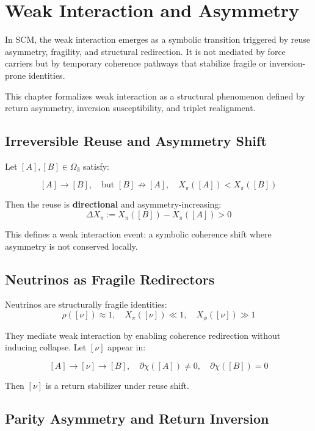 \chapter{Weak Interaction and Asymmetry} \label{chapter-weak-interaction}

In SCM, the weak interaction emerges as a symbolic transition triggered by reuse asymmetry, fragility, and structural redirection. It is not mediated by force carriers but by temporary coherence pathways that stabilize fragile or inversion-prone identities.

This chapter formalizes weak interaction as a structural phenomenon defined by return asymmetry, inversion susceptibility, and triplet realignment.

\section{Irreversible Reuse and Asymmetry Shift} \label{sec:weak-asymmetry}

Let $[A], [B] \in \Omega_3$ satisfy:

\[
[A] \to [B],\quad \text{but } [B] \not\to [A],\quad X_\pi([A]) < X_\pi([B])
\]

Then the reuse is \textbf{directional} and asymmetry-increasing:
\[
\Delta X_\pi := X_\pi([B]) - X_\pi([A]) > 0
\]

This defines a weak interaction event: a symbolic coherence shift where asymmetry is not conserved locally.

\section{Neutrinos as Fragile Redirectors} \label{sec:neutrinos-weak}

Neutrinos are structurally fragile identities:
\[
\rho([\nu]) \approx 1,\quad X_\pi([\nu]) \ll 1,\quad X_\phi([\nu]) \gg 1
\]

They mediate weak interaction by enabling coherence redirection without inducing collapse. Let $[\nu]$ appear in:

\[
[A] \to [\nu] \to [B],\quad \partial\chi([A]) \ne 0,\quad \partial\chi([B]) = 0
\]

Then $[\nu]$ is a return stabilizer under reuse shift.

\section{Parity Asymmetry and Return Inversion} \label{sec:parity-asymmetry}

